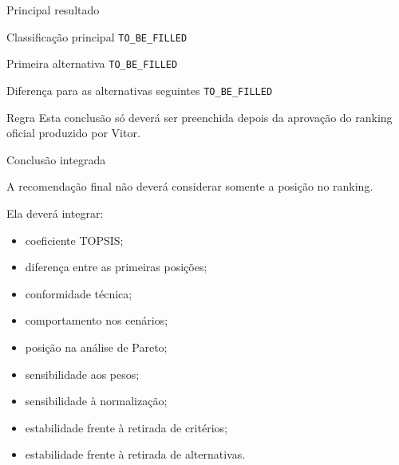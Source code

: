 
\begin{frame}{Principal resultado}

    \begin{block}{Classificação principal}
        \texttt{TO\_BE\_FILLED}
    \end{block}

    \vspace{0.3cm}

    \begin{block}{Primeira alternativa}
        \texttt{TO\_BE\_FILLED}
    \end{block}

    \vspace{0.3cm}

    \begin{block}{Diferença para as alternativas seguintes}
        \texttt{TO\_BE\_FILLED}
    \end{block}

    \vspace{0.3cm}

    \begin{alertblock}{Regra}
        Esta conclusão só deverá ser preenchida depois da aprovação
        do ranking oficial produzido por Vitor.
    \end{alertblock}

\end{frame}



\begin{frame}{Conclusão integrada}

    A recomendação final não deverá considerar somente a posição
    no ranking.

    \vspace{0.3cm}

    Ela deverá integrar:

    \begin{itemize}
        \item coeficiente TOPSIS;
        \item diferença entre as primeiras posições;
        \item conformidade técnica;
        \item comportamento nos cenários;
        \item posição na análise de Pareto;
        \item sensibilidade aos pesos;
        \item sensibilidade à normalização;
        \item estabilidade frente à retirada de critérios;
        \item estabilidade frente à retirada de alternativas.
    \end{itemize}

\end{frame}


